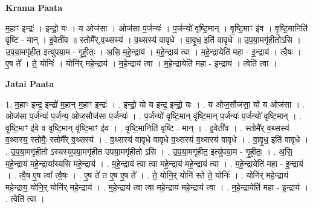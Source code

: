 \documentclass[17pt]{extarticle}
\begin{document}
\textbf{Krama Paata} \newline

म॒हाꣳ इन्द्रः॑ । इन्द्रो॒ यः । य ओज॑सा । ओज॑सा प॒र्जन्यः॑ । प॒र्जन्यो॑ वृष्टि॒मान् । वृ॒ष्टि॒माꣳ इ॑व । वृ॒ष्टि॒मानिति॑ वृष्टि - मान् । इ॒वेती॑व ॥ स्तोमै᳚र्,व॒थ्सस्य॑ । व॒थ्सस्य॑ वावृधे । वा॒वृ॒ध॒ इति॑ वावृधे ॥ उ॒प॒या॒मगृ॑हीतोऽसि । उ॒प॒या॒मगृ॑हीत॒ इत्यु॑पया॒म - गृ॒ही॒तः॒ । अ॒सि॒ म॒हे॒न्द्राय॑ । म॒हे॒न्द्राय॑ त्वा । म॒हे॒न्द्रायेति॑ महा - इ॒न्द्राय॑ । त्वै॒षः । ए॒ष ते᳚ । ते॒ योनिः॑ । योनि॑र् महे॒न्द्राय॑ । म॒हे॒न्द्राय॑ त्वा । म॒हे॒न्द्रायेति॑ महा - इ॒न्द्राय॑ । त्वेति॑ त्वा । \newline

\textbf{Jatai Paata} \newline

1. म॒हाꣳ इन्द्र॒ इन्द्रो॑ म॒हान् म॒हाꣳ इन्द्रः॑ । . इन्द्रो॒ यो य इन्द्र॒ इन्द्रो॒ यः । . य ओज॒सौज॑सा॒ यो य ओज॑सा । . ओज॑सा प॒र्जन्यः॑ प॒र्जन्य॒ ओज॒सौज॑सा प॒र्जन्यः॑ । . प॒र्जन्यो॑ वृष्टि॒मान् वृ॑ष्टि॒मान् प॒र्जन्यः॑ प॒र्जन्यो॑ वृष्टि॒मान् । . वृ॒ष्टि॒माꣳ इ॑वे व वृष्टि॒मान् वृ॑ष्टि॒माꣳ इ॑व । . वृ॒ष्टि॒मानिति॑ वृष्टि - मान् । . इ॒वेती॑व । . स्तोमै᳚र् व॒थ्सस्य॑ व॒थ्सस्य॒ स्तोमैः॒ स्तोमै᳚र् व॒थ्सस्य॑ । . व॒थ्सस्य॑ वावृधे वावृधे व॒थ्सस्य॑ व॒थ्सस्य॑ वावृधे । . वा॒वृ॒ध॒ इति॑ वावृधे । . उ॒प॒या॒मगृ॑हीतो ऽस्यस्युपया॒मगृ॑हीत उपया॒मगृ॑हीतो ऽसि । . उ॒प॒या॒मगृ॑हीत॒ इत्यु॑पया॒म - गृ॒ही॒तः॒ । . अ॒सि॒ म॒हे॒न्द्राय॑ महे॒न्द्राया᳚स्यसि महे॒न्द्राय॑ । . म॒हे॒न्द्राय॑ त्वा त्वा महे॒न्द्राय॑ महे॒न्द्राय॑ त्वा । . म॒हे॒न्द्रायेति॑ महा - इ॒न्द्राय॑ । . त्वै॒ष ए॒ष त्वा᳚ त्वै॒षः । . ए॒ष ते॑ त ए॒ष ए॒ष ते᳚ । . ते॒ योनि॒र् योनि॑ स्ते ते॒ योनिः॑ । . योनि॑र् महे॒न्द्राय॑ महे॒न्द्राय॒ योनि॒र् योनि॑र् महे॒न्द्राय॑ । . म॒हे॒न्द्राय॑ त्वा त्वा महे॒न्द्राय॑ महे॒न्द्राय॑ त्वा । . म॒हे॒न्द्रायेति॑ महा - इ॒न्द्राय॑ । . त्वेति॑ त्वा । \newline
\end{document}
